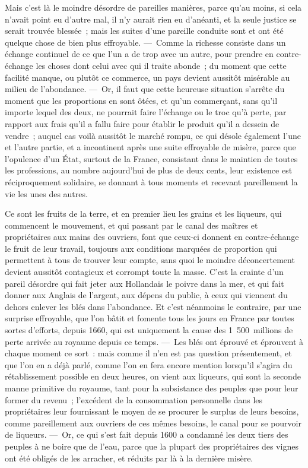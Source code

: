 \documentclass[french,twoside]{book} %
\begin{document}
Mais c’est là le moindre désordre de pareilles manières, parce qu’au moins, si cela n’avait point eu d’autre mal, il n’y aurait rien eu d’anéanti, et la seule justice se serait trouvée blessée ; mais les suites d’une pareille conduite sont et ont été quelque chose de bien plus effroyable. — Comme la richesse consiste dans un échange continuel de ce que l’un a de trop avec un autre, pour prendre en contre-échange les choses dont celui avec qui il traite abonde ; du moment que cette facilité manque, ou plutôt ce commerce, un pays devient aussitôt misérable au milieu de l’abondance. — Or, il faut que cette heureuse situation s’arrête du moment que les proportions en sont ôtées, et qu’un commerçant, sans qu’il importe lequel des deux, ne pourrait faire l’échange ou le troc qu’à perte, par rapport aux frais qu’il a fallu faire pour établir le produit qu’il a dessein de vendre ; auquel cas voilà aussitôt le marché rompu, ce qui désole également l’une et l’autre partie, et a incontinent après une suite effroyable de misère, parce que l’opulence d’un État, surtout de la France, consistant dans le maintien de toutes les professions, au nombre aujourd’hui de plus de deux cents, leur existence est réciproquement solidaire, se donnant à tous moments et recevant pareillement la vie les unes des autres.\par
Ce sont les fruits de la terre, et en premier lieu les grains et les liqueurs, qui commencent le mouvement, et qui passant par le canal des maîtres et propriétaires aux mains des ouvriers, font que ceux-ci donnent en contre-échange le fruit de leur travail, toujours aux conditions marquées de proportion qui permettent à tous de trouver leur compte, sans quoi le moindre déconcertement devient aussitôt contagieux et corrompt toute la masse. C’est la crainte d’un pareil désordre qui fait jeter aux Hollandais le poivre dans la mer, et qui fait donner aux Anglais de l’argent, aux dépens du public, à ceux qui viennent du dehors enlever les blés dans l’abondance. Et c’est néanmoins le contraire, par une surprise effroyable, que l’on bâtit et fomente tous les jours en France par toutes sortes d’efforts, depuis 1660, qui est uniquement la cause des 1 500 millions de perte arrivée au royaume depuis ce temps. — Les blés ont éprouvé et éprouvent à chaque moment ce sort : mais comme il n’en est pas question présentement, et que l’on en a déjà parlé, comme l’on en fera encore mention lorsqu’il s’agira du rétablissement possible en deux heures, on vient aux liqueurs, qui sont la seconde manne primitive du royaume, tant pour la subsistance des peuples que pour leur former du revenu ; l’excédent de la consommation personnelle dans les propriétaires leur fournissant le moyen de se procurer le surplus de leurs besoins, comme pareillement aux ouvriers de ces mêmes besoins, le canal pour se pourvoir de liqueurs. — Or, ce qui s’est fait depuis 1600 a condamné les deux tiers des peuples à ne boire que de l’eau, parce que la plupart des propriétaires des vignes ont été obligés de les arracher, et réduits par là à la dernière misère.\par
\end{document}

